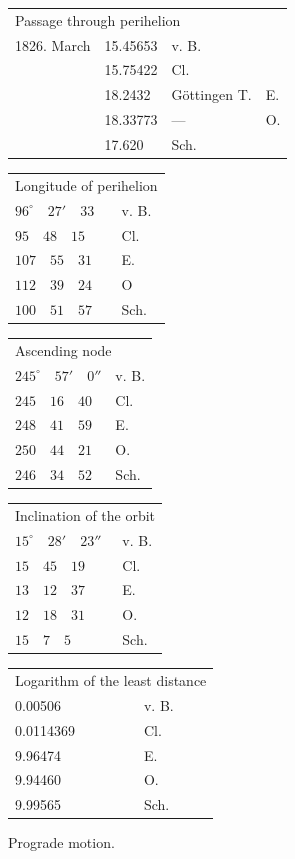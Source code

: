 \begin{center}
\begingroup\small\setlength{\tabcolsep}{5pt}
\begin{tabular}{rlll}
\multicolumn{4}{l}{Passage through perihelion} \\
1826. March & 15.45653 & v. B. & \\
 & 15.75422 & Cl. & \\
 & 18.2432 & Göttingen T. & E. \\
 & 18.33773 & --- & O. \\
 & 17.620 & Sch. & \\
\end{tabular}
\par\medskip
\begin{tabular}{ll}
\multicolumn{2}{l}{Longitude of perihelion} \\
$96^{\circ}\quad27'\quad33$ & v. B. \\
$95\quad48\quad15$ & Cl. \\
$107\quad55\quad31$ & E. \\
$112\quad39\quad24$ & O \\
$100\quad51\quad57$ & Sch. \\
\end{tabular}
\par\medskip
\begin{tabular}{ll}
\multicolumn{2}{l}{Ascending node} \\
$245^{\circ}\quad57'\quad0''$ & v. B. \\
$245\quad16\quad40$ & Cl. \\
$248\quad41\quad59$ & E. \\
$250\quad44\quad21$ & O. \\
$246\quad34\quad52$ & Sch. \\
\end{tabular}
\par\medskip
\begin{tabular}{ll}
\multicolumn{2}{l}{Inclination of the orbit} \\
$15^{\circ}\quad28'\quad23''$ & v. B. \\
$15\quad45\quad19$ & Cl. \\
$13\quad12\quad37$ & E. \\
$12\quad18\quad31$ & O. \\
$15\quad7\quad5$ & Sch. \\
\end{tabular}
\par\medskip
\begin{tabular}{ll}
\multicolumn{2}{l}{Logarithm of the least distance} \\
0.00506 & v. B. \\
0.0114369 & Cl. \\
9.96474 & E. \\
9.94460 & O. \\
9.99565 & Sch. \\
\end{tabular}
\endgroup
\end{center}
\noindent Prograde motion.

